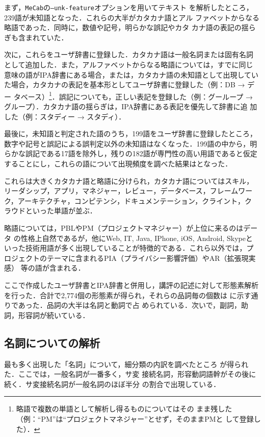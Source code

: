 \documentclass[submit]{ipsj}
\begin{document}
まず，\texttt{MeCab}の\texttt{--unk-feature}オプションを用いてテキスト
を解析したところ，239語が未知語となった．これらの大半がカタカナ語とアル
ファベットからなる略語であった．同時に，数値や記号，明らかな誤記やカタ
カナ語の表記の揺らぎも含まれていた．

次に，これらをユーザ辞書に登録した．カタカナ語は一般名詞または固有名詞
として追加した．また，アルファベットからなる略語については，すでに同じ
意味の語がIPA辞書にある場合，または，カタカナ語の未知語として出現してい
た場合，カタカナの表記を基本形としてユーザ辞書に登録した（例：DB → デー
タベース）\footnote{略語で複数の単語として解析し得るものについてはその
まま残した（例：``PM''は``プロジェクトマネジャー''とせず，そのままPMと
して登録した）．}．誤記についても，正しい表記を登録した（例：グーループ
→ グループ）．カタカナ語の揺らぎは，IPA辞書にある表記を優先して辞書に追
加した（例：スタディー → スタディ）．

最後に，未知語と判定された語のうち，199語をユーザ辞書に登録したところ，
数字や記号と誤記による誤判定以外の未知語はなくなった．199語の中から，明
らかな誤記である17語を除外し，残りの182語が専門性の高い用語であると仮定
することにし，これらの語について出現頻度を調べた結果はとなった．

これらは大きくカタカナ語と略語に分けられ，カタカナ語についてはスキル，
リーダシップ，アプリ，マネジャー，レビュー，データベース，フレームワー
ク，アーキテクチャ，コンピテンシ，ドキュメンテーション，クライント，ク
ラウドといった単語が並ぶ．

略語については，PBLやPM（プロジェクトマネジャー）が上位に来るのはデータ
の性格上自然であるが，他にWeb, IT, Java, IPhone, iOS, Android, Skypeと
いった技術用語が多く出現していることが特徴的である．これら以外では，プ
ロジェクトのテーマに含まれるPIA（プライバシー影響評価）やAR（拡張現実感）
等の語が含まれる．


ここで作成したユーザ辞書とIPA辞書と併用し，講評の記述に対して形態素解析
を行った．合計で2,774個の形態素が得られ，それらの品詞毎の個数は
に示す通りであった．品詞の大半は名詞と動詞で占
められている．次いで，副詞，助詞，形容詞が続いている．

\subsection{名詞についての解析}

最も多く出現した「名詞」について，細分類の内訳を調べたところ
が得られた．ここでは，一般名詞が一番多く，サ変
接続名詞，形容動詞語幹がその後に続く．サ変接続名詞が一般名詞のほぼ半分
の割合で出現している．
\end{document}
